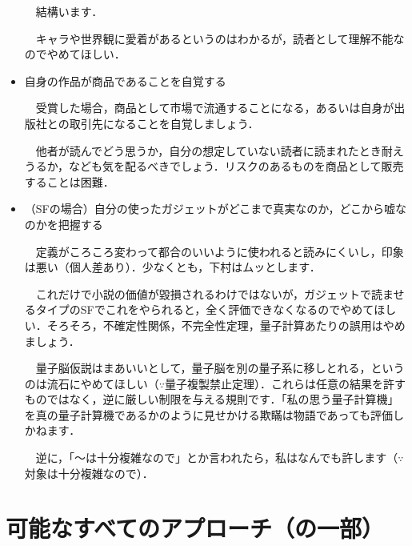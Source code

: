 \documentclass[10pt, a5paper, twoside]{jsarticle}
\theoremstyle{definition}
\begin{document}
\begin{itemize}
				\vspace{1mm}

				　結構います．

				　キャラや世界観に愛着があるというのはわかるが，読者として理解不能なのでやめてほしい．

				\vspace{2mm}

				\item 自身の作品が商品であることを自覚する

				\vspace{1mm}

				　受賞した場合，商品として市場で流通することになる，あるいは自身が出版社との取引先になることを自覚しましょう．

				　他者が読んでどう思うか，自分の想定していない読者に読まれたとき耐えうるか，なども気を配るべきでしょう．リスクのあるものを商品として販売することは困難．

				\vspace{2mm}

				\item （SFの場合）自分の使ったガジェットがどこまで真実なのか，どこから嘘なのかを把握する

				\vspace{1mm}

				　定義がころころ変わって都合のいいように使われると読みにくいし，印象は悪い（個人差あり）．少なくとも，下村はムッとします．

				　これだけで小説の価値が毀損されるわけではないが，ガジェットで読ませるタイプのSFでこれをやられると，全く評価できなくなるのでやめてほしい．そろそろ，不確定性関係，不完全性定理，量子計算あたりの誤用はやめましょう．

				　量子脳仮説はまあいいとして，量子脳を別の量子系に移しとれる，というのは流石にやめてほしい（$\because$量子複製禁止定理）．これらは任意の結果を許すものではなく，逆に厳しい制限を与える規則です．「私の思う量子計算機」を真の量子計算機であるかのように見せかける欺瞞は物語であっても評価しかねます．

				　逆に，「〜は十分複雑なので」とか言われたら，私はなんでも許します（$\because$対象は十分複雑なので）．

			\end{itemize}

	\section{可能なすべてのアプローチ（の一部）}
\end{document}
